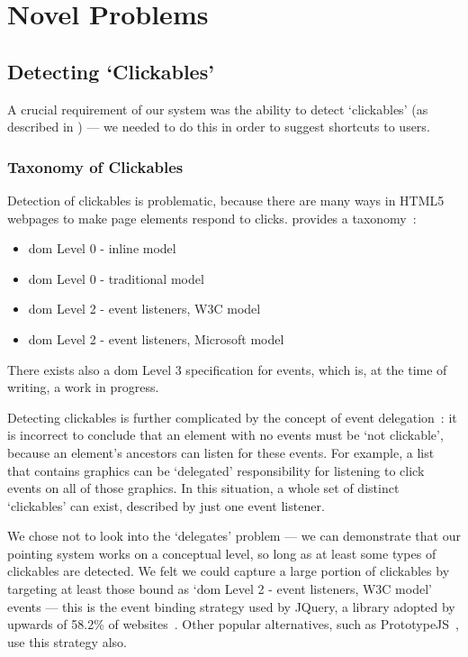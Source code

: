 \documentclass[11pt,openright,a4paper]{report}
\begin{document}
\section{Novel Problems}
\subsection{Detecting `Clickables'}
A crucial requirement of our system was the ability to detect `clickables' (as described in ) --- we needed to do this in order to suggest shortcuts to users.

\subsubsection{Taxonomy of Clickables}
Detection of clickables is problematic, because there are many ways in HTML5 webpages to make page elements respond to clicks. \citeauthor{events} provides a taxonomy~\cite{events}:

\begin{itemize}
	\item \gls{dom} Level 0 - inline model~\cite{inlineevents}
	\item \gls{dom} Level 0 - traditional model~\cite{traditionalevents}
	\item \gls{dom} Level 2 - event listeners, W3C model~\cite{domlevel2,advancedevents}
	\item \gls{dom} Level 2 - event listeners, Microsoft model
\end{itemize}

There exists also a \gls{dom} Level 3 specification for events\cite{domlevel3}, which is, at the time of writing, a work in progress.

Detecting clickables is further complicated by the concept of event delegation~\cite{franklin2013more}: it is incorrect to conclude that an element with no events must be `not clickable', because an element's ancestors can listen for these events. For example, a list that contains graphics can be `delegated' responsibility for listening to click events on all of those graphics. In this situation, a whole set of distinct `clickables' can exist, described by just one event listener.

We chose not to look into the `delegates' problem --- we can demonstrate that our pointing system works on a conceptual level, so long as at least some types of clickables are detected. We felt we could capture a large portion of clickables by targeting at least those bound as `\gls{dom} Level 2 - event listeners, W3C model' events --- this is the event binding strategy used by JQuery, a library adopted by upwards of 58.2\% of websites~\cite{jquerypopularity}. Other popular alternatives, such as PrototypeJS~\cite{prototypejs}, use this strategy also.
\end{document}
